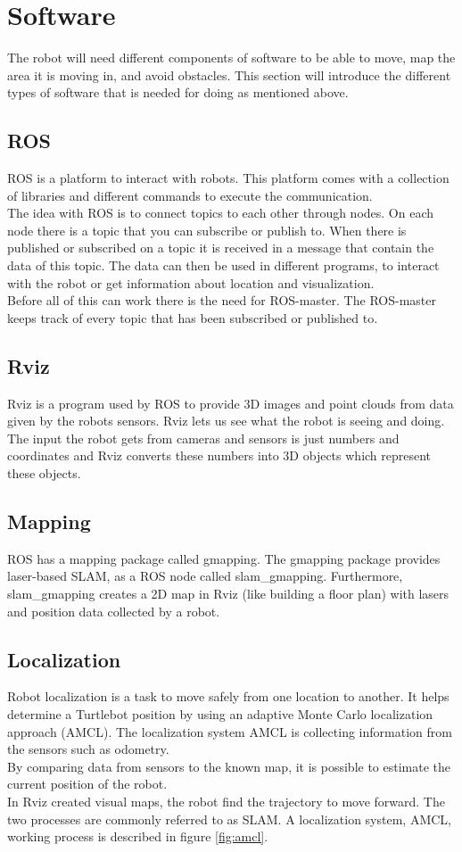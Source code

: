 \section{Software}
The robot will need different components of software to be able to move, map the area it is moving in, and avoid obstacles. This section will introduce the different types of software that is needed for doing as mentioned above.

\subsection{ROS}
ROS is a platform to interact with robots. This platform comes with a collection of libraries and different commands to execute the communication.\\
The idea with ROS is to connect topics to each other through nodes. On each node there is a topic that you can subscribe or publish to. When there is published or subscribed on a topic it is received in a message that contain the data of this topic. The data can then be used in different programs, to interact with the robot or get information about location and visualization. \\
Before all of this can work there is the need for ROS-master. The ROS-master keeps track of every topic that has been subscribed or published to.

\subsection{Rviz}
Rviz is a program used by ROS to provide 3D images and point clouds from data given by the robots sensors. Rviz lets us see what the robot is seeing and doing. The input the robot gets from cameras and sensors is just numbers and coordinates and Rviz converts these numbers into 3D objects which represent these objects\cite{interactiveMarkers}.

\subsection{Mapping}
ROS has a mapping package called gmapping. The gmapping package provides laser-based SLAM, as a ROS node called slam\_gmapping. Furthermore, slam\_gmapping creates a 2D map in Rviz (like building a floor plan) with lasers and position data collected by a robot\cite{mapping}.

\subsection{Localization}
Robot localization is a task to move safely from one location to another.
It helps determine a  Turtlebot position by using an adaptive Monte Carlo localization approach (AMCL). The localization system AMCL is collecting information from the sensors such as odometry.\\By comparing data from sensors to the known map, it is possible to estimate the current position of the robot.\\In Rviz created visual maps, the robot find the trajectory to move forward. The two processes are commonly referred to as SLAM. A localization system, AMCL, working process is described in figure \ref{fig:amcl}.

